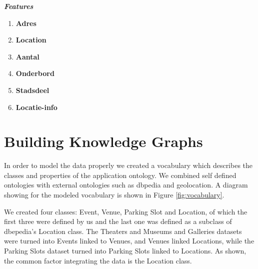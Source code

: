 \documentclass[runningheads,a4paper]{../../StyleFiles/llncs}
\begin{document}
\begin{center}
	\textbf{\emph{Features}}
	\setlength{\columnsep}{4em}
	\begin{multicols}{2}
		\begin{enumerate}
			\item \textbf{Adres}
			\item \textbf{Location}
			\item \textbf{Aantal}
			\item \textbf{Onderbord}
			\item \textbf{Stadsdeel}	
			\item \textbf{Locatie-info}				
		\end{enumerate}
	\end{multicols}
\end{center} 

\section{Building Knowledge Graphs}
In order to model the data properly we created a vocabulary which describes the classes and properties of the application ontology. We combined self defined ontologies with external ontologies such as dbpedia and geolocation. A diagram showing for the modeled vocabulary is shown in Figure \ref{fig:vocabulary}. 

We created four classes: Event, Venue, Parking Slot and Location, of which the first three were defined by us and the last one was defined as a subclass of dbepedia's Location class. The Theaters and Museums and Galleries datasets were turned into Events linked to Venues, and Venues linked Locations, while the Parking Slots dataset turned into Parking Slots linked to Locations. As shown, the common factor integrating the data is the Location class. 
\end{document}
